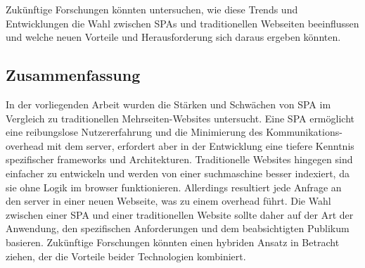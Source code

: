 Zukünftige Forschungen könnten untersuchen, wie diese Trends und Entwicklungen die Wahl zwischen \ac{SPA}s und traditionellen Webseiten beeinflussen und welche neuen Vorteile und Herausforderung sich daraus ergeben könnten.

\subsection{Zusammenfassung}
In der vorliegenden Arbeit wurden die Stärken und Schwächen von \ac{SPA} im Vergleich zu traditionellen Mehrseiten-Websites untersucht.
Eine \ac{SPA} ermöglicht eine reibungslose Nutzererfahrung und die Minimierung des Kommunikations-\gls{overhead} mit dem \gls{server}, erfordert aber in der Entwicklung eine tiefere Kenntnis spezifischer \gls{framework}s und Architekturen.
Traditionelle Websites hingegen sind einfacher zu entwickeln und werden von einer \gls{suchmaschine} besser indexiert, da sie ohne Logik im \gls{browser} funktionieren.
Allerdings resultiert jede Anfrage an den \gls{server} in einer neuen Webseite, was zu einem \gls{overhead} führt.
Die Wahl zwischen einer \ac{SPA} und einer traditionellen Website sollte daher auf der Art der Anwendung, den spezifischen Anforderungen und dem beabsichtigten Publikum basieren.
Zukünftige Forschungen könnten einen hybriden Ansatz in Betracht ziehen, der die Vorteile beider Technologien kombiniert.